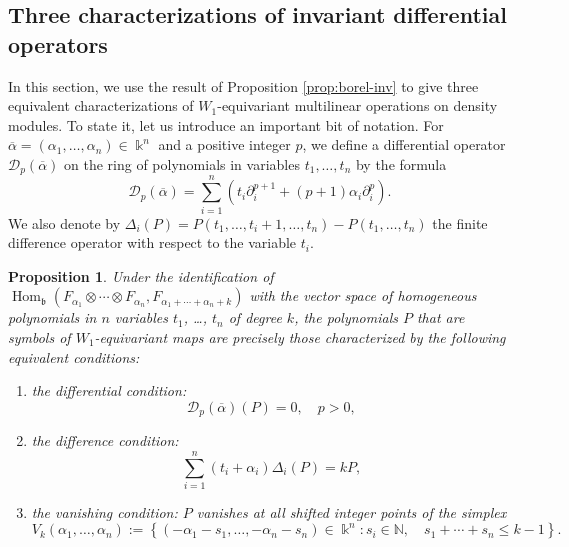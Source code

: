\documentclass[11pt,reqno]{amsart}
\theoremstyle{plain}
\newtheorem{proposition}[theorem]{Proposition}
\theoremstyle{definition}
\theoremstyle{remark}
\newcommand{\bk}{\Bbbk}
\DeclareMathOperator{\Hom}{Hom}
\newcommand{\cD}{\mathcal D}
\begin{document}
\subsection{Three characterizations of invariant differential operators}\label{sec:3charact}

In this section, we use the result of Proposition \ref{prop:borel-inv} to give three equivalent characterizations of $W_1$-equivariant multilinear operations on density modules. To state it, let us introduce an important bit of notation. For $\overline\alpha=(\alpha_1,\ldots,\alpha_n)\in\bk^n$ and a positive integer $p$, we define a differential operator $\cD_p(\overline\alpha)$ on the ring of polynomials in variables $t_1,\ldots,t_n$ by the formula
 \[
\cD_p(\overline\alpha)=\sum_{i=1}^n\left(t_i\partial_i^{p+1}+(p+1)\alpha_i\partial_i^p\right) .   
 \]
We also denote by $\Delta_i(P)=P(t_1,\ldots,t_i+1,\ldots,t_n)-P(t_1,\ldots,t_n)$ the finite difference operator with respect to the variable $t_i$.

\begin{proposition}\label{prop:3conds}
Under the identification of $\Hom_{\mathfrak{b}}(F_{\alpha_1}\otimes\cdots\otimes F_{\alpha_n},F_{\alpha_1+\cdots+\alpha_n+k})$ with the vector space of homogeneous polynomials in $n$ variables $t_1$, \ldots, $t_n$ of degree $k$, the polynomials $P$ that are symbols of $W_1$-equivariant  maps are precisely those characterized by the following equivalent conditions:
\begin{enumerate}
\item the differential condition:
\begin{equation}\label{eq:invDifOp-PDE}
\cD_p(\overline\alpha)(P)=0, \quad p>0,
\end{equation}
\item the difference condition: \begin{equation}\label{eq:invDifOp-difference}
\sum_{i=1}^n(t_i+\alpha_i)\Delta_i(P)=k P,
\end{equation}
\item the vanishing condition: $P$ vanishes at all shifted integer points of the simplex 
\begin{equation}\label{eq:simplex}
V_k(\alpha_1,\ldots,\alpha_n):=
\left\{
(-\alpha_1-s_1,\dots,-\alpha_n-s_n)\in\bk^n\colon 
s_i\in\mathbb{N},\quad s_1+\cdots+s_n\le k-1
\right\}.
\end{equation}
\end{enumerate}
\end{proposition}
 
\end{document}
